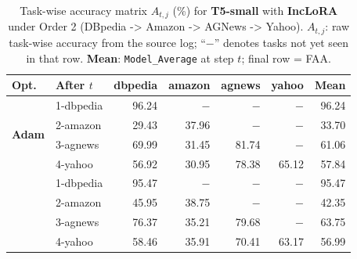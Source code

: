 \begin{table}[ht]
\centering
\caption{%
  Task-wise accuracy matrix $A_{t,j}$ (\%) for \textbf{T5-small} with \textbf{IncLoRA} under Order 2 (DBpedia -> Amazon -> AGNews -> Yahoo).
  $A_{t,j}$: raw task-wise accuracy from the source log; ``$-$'' denotes tasks not yet seen in that row.
  \textbf{Mean}: \texttt{Model\_Average} at step $t$; final row = FAA.
}
\label{tab:nlp_o2_t5small_inclora}
\setlength{\tabcolsep}{4.0pt}
\renewcommand{\arraystretch}{0.92}
\scriptsize
\begin{tabular}{@{}l l r r r r r@{}}
\toprule
\textbf{Opt.} & \textbf{After $t$} & \textbf{dbpedia} & \textbf{amazon} & \textbf{agnews} & \textbf{yahoo} & \textbf{Mean} \\
\midrule
\multirow{4}{*}{\textbf{Adam}} & 1-dbpedia & 96.24 & $-$ & $-$ & $-$ & 96.24 \\
 & 2-amazon & 29.43 & 37.96 & $-$ & $-$ & 33.70 \\
 & 3-agnews & 69.99 & 31.45 & 81.74 & $-$ & 61.06 \\
 & 4-yahoo & 56.92 & 30.95 & 78.38 & 65.12 & 57.84 \\
\addlinespace[2pt]
\multirow{4}{*}{\textbf{SAM}} & 1-dbpedia & 95.47 & $-$ & $-$ & $-$ & 95.47 \\
 & 2-amazon & 45.95 & 38.75 & $-$ & $-$ & 42.35 \\
 & 3-agnews & 76.37 & 35.21 & 79.68 & $-$ & 63.75 \\
 & 4-yahoo & 58.46 & 35.91 & 70.41 & 63.17 & 56.99 \\
\bottomrule
\end{tabular}
\end{table}

